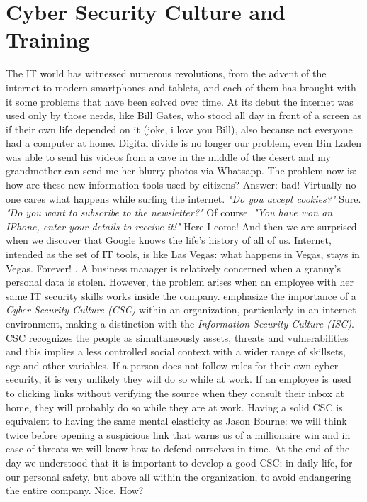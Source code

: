 \section{Cyber Security Culture and Training}
The IT world has witnessed numerous revolutions, from the advent of the internet to modern smartphones and tablets, and each of them has brought with it some problems that have been solved over time. At its debut the internet was used only by those nerds, like Bill Gates, who stood all day in front of a screen as if their own life depended on it (joke, i love you Bill), also because not everyone had a computer at home. Digital divide is no longer our problem, even Bin Laden was able to send his videos from a cave in the middle of the desert and my grandmother can send me her blurry photos via Whatsapp. The problem now is: how are these new information tools used by citizens? Answer: bad! Virtually no one cares what happens while surfing the internet. \textit{"Do you accept cookies?"} Sure. \textit{"Do you want to subscribe to the newsletter?"} Of course. \textit{"You have won an IPhone, enter your details to receive it!"} Here I come! And then we are surprised when we discover that Google knows the life's history of all of us. Internet, intended as the set of IT tools, is like Las Vegas: what happens in Vegas, stays in Vegas. Forever! \cite{RONCHI2019}. A business manager is relatively concerned when a granny's personal data is stolen. However, the problem arises when an employee with her same IT security skills works inside the company. \cite{Reid2014} emphasize the importance of a \textit{Cyber Security Culture (CSC)} within an organization, particularly in an internet environment, making a distinction with the \textit{Information Security Culture (ISC)}. CSC recognizes the people as simultaneously assets, threats and vulnerabilities and this implies a less controlled social context with a wider range of skillsets, age and other variables. If a person does not follow rules for their own cyber security, it is very unlikely they will do so while at work. If an employee is used to clicking links without verifying the source when they consult their inbox at home, they will probably do so while they are at work. Having a solid CSC is equivalent to having the same mental elasticity as Jason Bourne: we will think twice before opening a suspicious link that warns us of a millionaire win and in case of threats we will know how to defend ourselves in time. At the end of the day we understood that it is important to develop a good CSC: in daily life, for our personal safety, but above all within the organization, to avoid endangering the entire company. Nice. How?
